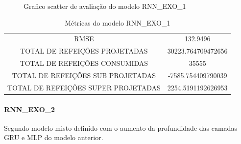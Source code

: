 {\begin{center}
\begin{minipage}[c]{0.45\textwidth}
\begin{figure}[H]
{                    \caption{Grafico scatter de avaliação do modelo RNN\_EXO\_1} \label{fig:case1_rnn_exo_1_val_scatter} }
                \end{figure}
                \end{minipage} \end{center} }
               
                
                \begin{table}[!ht]
                \centering
                \caption{Métricas do modelo  RNN\_EXO\_1 }
                \begin{tabular}{|c|c|}
                \rowcolor{gray!50}
                \hline
                \multicolumn{2}{c}{METRICAS DO MODELO RNN\_EXO\_1 :}\\ \hline
                RMSE & 132.9496\\
                TOTAL DE REFEIÇÕES PROJETADAS & 30223.764709472656\\
                TOTAL DE REFEIÇÕES CONSUMIDAS & 35555\\
                TOTAL DE REFEIÇÕES SUB PROJETADAS & -7585.754409790039\\
                TOTAL DE REFEIÇÕES SUPER PROJETADAS & 2254.5191192626953\\
                \hline \end{tabular} \end{table}
                
              \paragraph{RNN\_EXO\_2} Segundo modelo misto definido com o aumento da profundidade das camadas GRU e MLP do modelo anterior.
                \begin{figure}[H]
                \end{figure}
                

